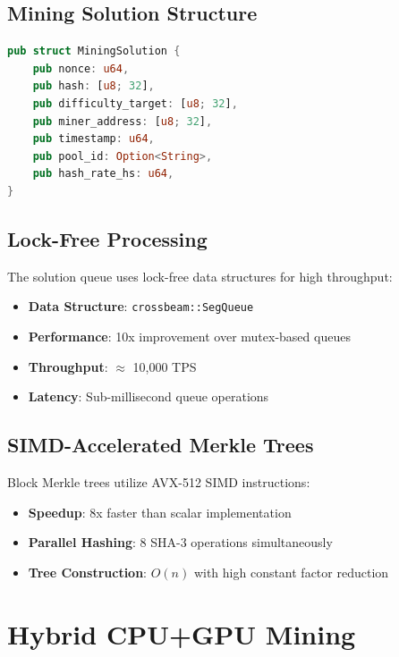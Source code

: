 \documentclass[11pt,a4paper]{article}
\begin{document}
\subsection{Mining Solution Structure}

\begin{lstlisting}[language=Rust, caption=Mining Solution]
pub struct MiningSolution {
    pub nonce: u64,
    pub hash: [u8; 32],
    pub difficulty_target: [u8; 32],
    pub miner_address: [u8; 32],
    pub timestamp: u64,
    pub pool_id: Option<String>,
    pub hash_rate_hs: u64,
}
\end{lstlisting}

\subsection{Lock-Free Processing}

The solution queue uses lock-free data structures for high throughput:

\begin{itemize}
    \item \textbf{Data Structure}: \texttt{crossbeam::SegQueue}
    \item \textbf{Performance}: 10x improvement over mutex-based queues
    \item \textbf{Throughput}: $\approx$ 10,000 TPS
    \item \textbf{Latency}: Sub-millisecond queue operations
\end{itemize}

\subsection{SIMD-Accelerated Merkle Trees}

Block Merkle trees utilize AVX-512 SIMD instructions:

\begin{itemize}
    \item \textbf{Speedup}: 8x faster than scalar implementation
    \item \textbf{Parallel Hashing}: 8 SHA-3 operations simultaneously
    \item \textbf{Tree Construction}: $O(n)$ with high constant factor reduction
\end{itemize}

\section{Hybrid CPU+GPU Mining}
\end{document}
